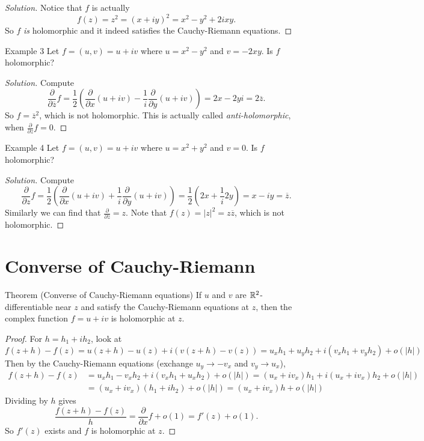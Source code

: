 \begin{proof}[Solution]
  Notice that $f$ is actually
  \[f(z) = z^2 = (x + iy)^2 = x^2 - y^2 + 2ixy.\]
  So $f$ \textit{is} holomorphic and it indeed satisfies
  the Cauchy-Riemann equations.
\end{proof}

\begin{examp}{Example 3}
  Let $f = (u, v) = u + iv$ where $u = x^2 - y^2$ and
  $v = -2xy$. Is $f$ holomorphic?
\end{examp}

\begin{proof}[Solution]
  Compute
  \[
    \frac{\partial}{\partial \overline{z}} f
    = \frac{1}{2}\left(\frac{\partial}{\partial x} (u + iv) - \frac{1}{i} \frac{\partial}{\partial y} (u + iv)\right)
    = 2x - 2yi = 2\overline{z}
  .\]
  So $f = {\overline{z}}^2$, which is not
  holomorphic. This is actually called
  \textit{anti-holomorphic}, when
  $\frac{\partial}{\partial z} f = 0$.
\end{proof}

\begin{examp}{Example 4}
  Let $f = (u, v) = u + iv$ where $u = x^2 + y^2$ and
  $v = 0$. Is $f$ holomorphic?
\end{examp}

\begin{proof}[Solution]
  Compute
  \[
  \frac{\partial}{\partial z} f =
  \frac{1}{2}\left(\frac{\partial}{\partial x}(u + iv) + \frac{1}{i} \frac{\partial}{\partial y} (u + iv)\right)
  = \frac{1}{2}\left(2x + \frac{1}{i} 2y\right)
  = x - iy = \overline{z}
  .\]
  Similarly we can find that
  $\frac{\partial}{\partial \overline{z}} = z$.
  Note that $f(z) = |z|^2 = z \overline{z}$, which
  is not holomorphic.
\end{proof}

\section{Converse of Cauchy-Riemann}
\begin{thm}{Theorem (Converse of Cauchy-Riemann equations)}
  If $u$ and $v$ are $\mathbb{R}^2$-differentiable near $z$ and
  satisfy the Cauchy-Riemann equations at $z$,
  then the complex function $f = u + iv$ is holomorphic
  at $z$.
\end{thm}

\begin{proof}
  For $h = h_1 + ih_2$, look at
  \[
    f(z + h) - f(z) = u(z + h) - u(z)
    + i(v(z + h) - v(z))
    = u_x h_1 + u_y h_2 + i(v_x h_1 + v_y h_2)
    + o(|h|)
  \]
  Then by the Cauchy-Riemann equations
  (exchange $u_y \to -v_x$ and $v_y \to u_x$),
  \begin{align*}
    f(z + h) - f(z)
    &= u_x h_1 - v_x h_2 + i(v_x h_1 + u_x h_2) + o(|h|)
    = (u_x + iv_x) h_1 + i(u_x + iv_x) h_2 + o(|h|) \\
    &= (u_x + iv_x) (h_1 + ih_2) + o(|h|)
    = (u_x + iv_x) h + o(|h|)
  \end{align*}
  Dividing by $h$ gives
  \[
    \frac{f(z + h) - f(z)}{h} =
    \frac{\partial}{\partial x} f + o(1)
    = f'(z) + o(1)
  .\]
  So $f'(z)$ exists and $f$ is holomorphic at $z$.
\end{proof}

